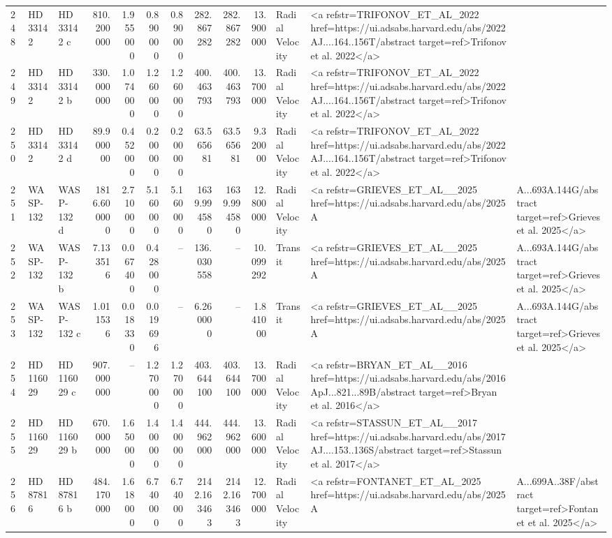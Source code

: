 \begin{tabular}{lllrrrrrrrll}
248 & HD 33142 & HD 33142 c & 810.200000 & 1.955000 & 0.890000 & 0.890000 & 282.867282 & 282.867282 & 13.900000 & Radial Velocity & <a refstr=TRIFONOV_ET_AL_2022 href=https://ui.adsabs.harvard.edu/abs/2022AJ....164..156T/abstract target=ref>Trifonov et al. 2022</a> \\
249 & HD 33142 & HD 33142 b & 330.000000 & 1.074000 & 1.260000 & 1.260000 & 400.463793 & 400.463793 & 13.700000 & Radial Velocity & <a refstr=TRIFONOV_ET_AL_2022 href=https://ui.adsabs.harvard.edu/abs/2022AJ....164..156T/abstract target=ref>Trifonov et al. 2022</a> \\
250 & HD 33142 & HD 33142 d & 89.900000 & 0.452000 & 0.200000 & 0.200000 & 63.565681 & 63.565681 & 9.320000 & Radial Velocity & <a refstr=TRIFONOV_ET_AL_2022 href=https://ui.adsabs.harvard.edu/abs/2022AJ....164..156T/abstract target=ref>Trifonov et al. 2022</a> \\
251 & WASP-132 & WASP-132 d & 1816.600000 & 2.710000 & 5.160000 & 5.160000 & 1639.994580 & 1639.994580 & 12.800000 & Radial Velocity & <a refstr=GRIEVES_ET_AL__2025 href=https://ui.adsabs.harvard.edu/abs/2025A&A...693A.144G/abstract target=ref>Grieves et al. 2025</a> \\
252 & WASP-132 & WASP-132 b & 7.133516 & 0.067400 & 0.428000 & -- & 136.030558 & -- & 10.099292 & Transit & <a refstr=GRIEVES_ET_AL__2025 href=https://ui.adsabs.harvard.edu/abs/2025A&A...693A.144G/abstract target=ref>Grieves et al. 2025</a> \\
253 & WASP-132 & WASP-132 c & 1.011536 & 0.018330 & 0.019696 & -- & 6.260000 & -- & 1.841000 & Transit & <a refstr=GRIEVES_ET_AL__2025 href=https://ui.adsabs.harvard.edu/abs/2025A&A...693A.144G/abstract target=ref>Grieves et al. 2025</a> \\
254 & HD 116029 & HD 116029 c & 907.000000 & -- & 1.270000 & 1.270000 & 403.644100 & 403.644100 & 13.700000 & Radial Velocity & <a refstr=BRYAN_ET_AL__2016 href=https://ui.adsabs.harvard.edu/abs/2016ApJ...821...89B/abstract target=ref>Bryan et al. 2016</a> \\
255 & HD 116029 & HD 116029 b & 670.000000 & 1.650000 & 1.400000 & 1.400000 & 444.962000 & 444.962000 & 13.600000 & Radial Velocity & <a refstr=STASSUN_ET_AL__2017 href=https://ui.adsabs.harvard.edu/abs/2017AJ....153..136S/abstract target=ref>Stassun et al. 2017</a> \\
256 & HD 87816 & HD 87816 b & 484.170000 & 1.618000 & 6.740000 & 6.740000 & 2142.163463 & 2142.163463 & 12.700000 & Radial Velocity & <a refstr=FONTANET_ET_AL_2025 href=https://ui.adsabs.harvard.edu/abs/2025A&A...699A..38F/abstract target=ref>Fontanet et al. 2025</a> \\

\end{tabular}
